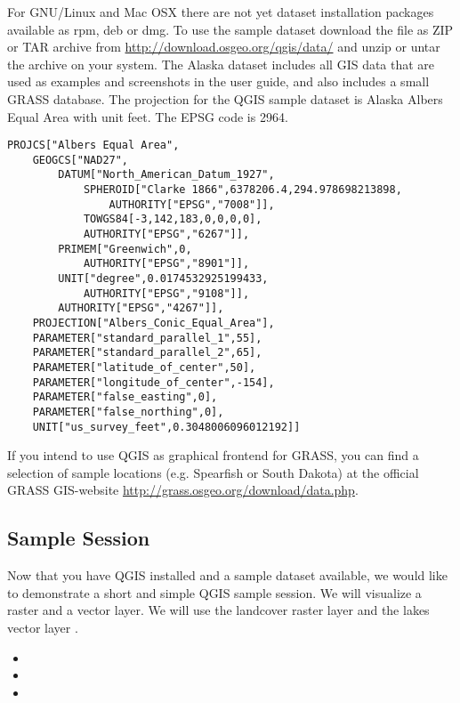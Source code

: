 \nix \osx For GNU/Linux and Mac OSX there are not yet dataset installation
packages available as rpm, deb or dmg. To use the sample dataset download the
file  as ZIP or TAR archive from
\url{http://download.osgeo.org/qgis/data/} and unzip or untar the archive on
your system. The Alaska dataset includes all GIS data that are used as
examples and screenshots in the user guide, and also includes a small GRASS
database. The projection for the QGIS sample dataset is Alaska Albers Equal
Area with unit feet. The EPSG code is 2964.

\begin{verbatim}
PROJCS["Albers Equal Area",
    GEOGCS["NAD27",
        DATUM["North_American_Datum_1927",
            SPHEROID["Clarke 1866",6378206.4,294.978698213898,
                AUTHORITY["EPSG","7008"]],
            TOWGS84[-3,142,183,0,0,0,0],
            AUTHORITY["EPSG","6267"]],
        PRIMEM["Greenwich",0,
            AUTHORITY["EPSG","8901"]],
        UNIT["degree",0.0174532925199433,
            AUTHORITY["EPSG","9108"]],
        AUTHORITY["EPSG","4267"]],
    PROJECTION["Albers_Conic_Equal_Area"],
    PARAMETER["standard_parallel_1",55],
    PARAMETER["standard_parallel_2",65],
    PARAMETER["latitude_of_center",50],
    PARAMETER["longitude_of_center",-154],
    PARAMETER["false_easting",0],
    PARAMETER["false_northing",0],
    UNIT["us_survey_feet",0.3048006096012192]]
\end{verbatim}

If you intend to use QGIS as graphical frontend for GRASS, you can find a
selection of sample locations (e.g. Spearfish or South Dakota) at the
official GRASS GIS-website \url{http://grass.osgeo.org/download/data.php}. 

\subsection{Sample Session}\label{samplesession}

Now that you have QGIS installed and a sample dataset available, we would 
like to demonstrate a short and simple QGIS sample session. We will visualize 
a raster and a vector layer. We will use the landcover raster 
layer  and the lakes 
vector layer .


\begin{itemize}
\item {}
\item {}
\item {}
\end{itemize} 

